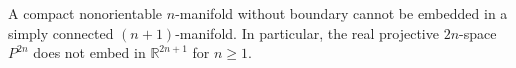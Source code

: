 A compact nonorientable $n$-manifold without boundary cannot be embedded in a simply connected $(n+1)$-manifold. In particular, the real projective $2n$-space $P^{2n}$ does not embed in $\mathbb{R}^{2n+1}$ for $n \geqslant 1$.

